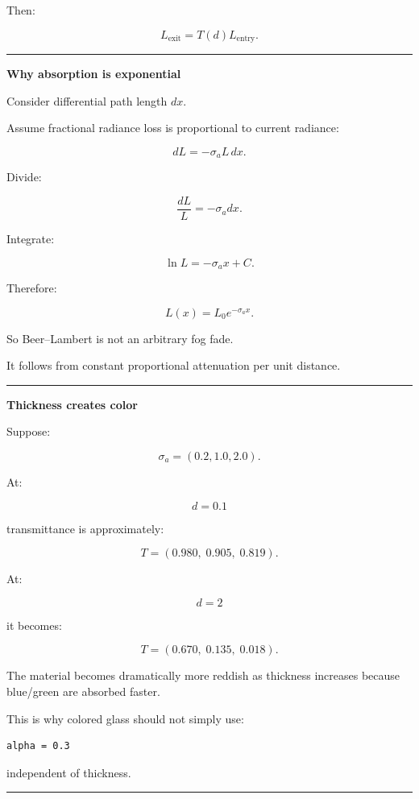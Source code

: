 Then:

\[
L_{\text{exit}}
=
T(d)
L_{\text{entry}}.
\]

\begin{center}\rule{0.5\linewidth}{0.5pt}\end{center}

\textbf{Why absorption is exponential}

Consider differential path length \(dx\).

Assume fractional radiance loss is proportional to current radiance:

\[
dL=-\sigma_aL\,dx.
\]

Divide:

\[
\frac{dL}{L}
=
-\sigma_a dx.
\]

Integrate:

\[
\ln L
=
-\sigma_a x+C.
\]

Therefore:

\[
L(x)
=
L_0e^{-\sigma_a x}.
\]

So Beer--Lambert is not an arbitrary fog fade.

It follows from constant proportional attenuation per unit distance.

\begin{center}\rule{0.5\linewidth}{0.5pt}\end{center}

\textbf{Thickness creates color}

Suppose:

\[
\sigma_a=
(0.2,1.0,2.0).
\]

At:

\[
d=0.1
\]

transmittance is approximately:

\[
T=
(0.980,\;0.905,\;0.819).
\]

At:

\[
d=2
\]

it becomes:

\[
T=
(0.670,\;0.135,\;0.018).
\]

The material becomes dramatically more reddish as thickness increases because blue/green are absorbed faster.

This is why colored glass should not simply use:

\begin{verbatim}
alpha = 0.3
\end{verbatim}

independent of thickness.

\begin{center}\rule{0.5\linewidth}{0.5pt}\end{center}

